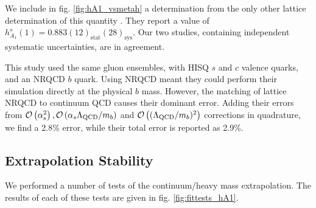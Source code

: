 We include in fig. \ref{fig:hA1_vsmetah} a determination from the only other lattice determination of this quantity \cite{Harrison:2017fmw}. They report a value of $h_{A_1}^s(1) = 0.883(12)_{\text{stat}}(28)_{\text{sys}}$. Our two studies, containing independent systematic uncertainties, are in agreement.

This study used the same gluon ensembles, with HISQ $s$ and $c$ valence quarks, and an NRQCD $b$ quark. Using NRQCD meant they could perform their simulation directly at the physical $b$ mass. However, the matching of lattice NRQCD to continuum QCD causes their dominant error. Adding their errors from $\mathcal{O}\left( \alpha_s^2 \right),\mathcal{O}\left( \alpha_s \Lambda_{\text{QCD}}/m_b \right)$ and $\mathcal{O}\left( (\Lambda_{\text{QCD}}/m_b)^2 \right)$ corrections in quadrature, we find a 2.8\% error, while their total error is reported as 2.9\%.

\subsection{Extrapolation Stability}
\label{sec:stability}

We performed a number of tests of the continuum/heavy mass extrapolation. The results of each of these tests are given in fig. \ref{fig:fittests_hA1}.


